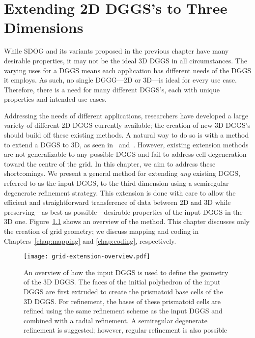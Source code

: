 \chapter{Extending 2D DGGS's to Three Dimensions} \label{chap:extension}
While SDOG and its variants proposed in the previous chapter have many desirable properties, it may not be the ideal 3D DGGS in all circumstances.
The varying uses for a DGGS means each application has different needs of the DGGS it employs.
As such, no single DGGG---2D or 3D---is ideal for every use case.
Therefore, there is a need for many different DGGS's, each with unique properties and intended use cases.


Addressing the needs of different applications, researchers have developed a large variety of different 2D DGGS currently available; the creation of new 3D DGGS's should build off these existing methods.
A natural way to do so is with a method to extend a DGGS to 3D, as seen in~\cite{xie2013interactive} and~\cite{sirdeshmukh2019utilizing}.
However, existing extension methods are not generalizable to any possible DGGS and fail to address cell degeneration toward the centre of the grid.
In this chapter, we aim to address these shortcomings.
We present a general method for extending \textit{any} existing DGGS, referred to as the input DGGS, to the third dimension using a semiregular degenerate refinement strategy.
This extension is done with care to allow the efficient and straightforward transference of data between 2D and 3D while preserving---as best as possible---desirable properties of the input DGGS in the 3D one.
Figure~\ref{fig:extension} shows an overview of the method.
This chapter discusses only the creation of grid geometry; we discuss mapping and coding in Chapters~\ref{chap:mapping} and \ref{chap:coding}, respectively.


\begin{figure}[ht!]
	\centering
	\texttt{[image: grid-extension-overview.pdf]}
	\caption[Overview of the grid extension method]{
		An overview of how the input DGGS is used to define the geometry of the 3D DGGS.
		The faces of the initial polyhedron of the input DGGS are first extruded to create the prismatoid base cells of the 3D DGGS.
		For refinement, the bases of these prismatoid cells are refined using the same refinement scheme as the input DGGS and combined with a radial refinement.
		A semiregular degenerate refinement is suggested; however, regular refinement is also possible
	}
	\label{fig:extension}
\end{figure}


